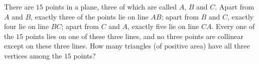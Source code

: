 There are $15$ points in a plane, three of which are called $A$, $B$ and $C$. Apart from $A$ and $B$, exactly three of the points lie on line $AB$; apart from $B$ and $C$, exactly four lie on line $BC$; apart from $C$ and $A$, exactly five lie on line $CA$. Every one of the $15$ points lies on one of these three lines, and no three points are collinear except on these three lines. How many triangles (of positive area) have all three vertices among the $15$ points?
